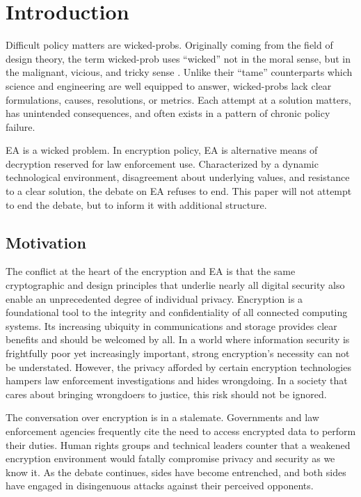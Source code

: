 \chapter{Introduction}
\label{chap-introduction}

Difficult policy matters are \acp{wicked-prob}. Originally coming from the field of design theory, the term
\ac{wicked-prob} uses ``wicked'' not in the moral sense, but in the malignant, vicious, and tricky sense
\cite{rittel_dilemmas_1973}. Unlike their ``tame'' counterparts which science and engineering are well equipped to
answer, \acp{wicked-prob} lack clear formulations, causes, resolutions, or metrics. Each attempt at a solution matters,
has unintended consequences, and often exists in a pattern of chronic policy failure.

\Acl{EA} is a wicked problem. In encryption policy, \ac{EA} is alternative means of decryption reserved for law
enforcement use. Characterized by a dynamic technological environment, disagreement about underlying values, and
resistance to a clear solution, the debate on \acl{EA} refuses to end. This paper will not attempt to end the debate,
but to inform it with additional structure.


\section{Motivation}
\label{sec-motivation}

The conflict at the heart of the encryption and \acl{EA} is that the same cryptographic and design principles that
underlie nearly all digital security also enable an unprecedented degree of individual privacy. Encryption is a
foundational tool to the integrity and confidentiality of all connected computing systems. Its increasing ubiquity in
communications and storage provides clear benefits and should be welcomed by all. In a world where information security
is frightfully poor yet increasingly important, strong encryption's necessity can not be understated. However, the
privacy afforded by certain encryption technologies hampers law enforcement investigations and hides wrongdoing. In a
society that cares about bringing wrongdoers to justice, this risk should not be ignored.

The conversation over encryption is in a stalemate. Governments and law enforcement agencies frequently cite the need to
access encrypted data to perform their duties. Human rights groups and technical leaders counter that a weakened
encryption environment would fatally compromise privacy and security as we know it. As the debate continues, sides have
become entrenched, and both sides have engaged in disingenuous attacks against their perceived opponents.

